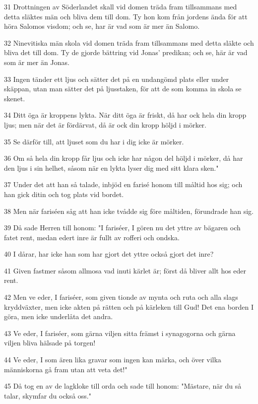 \par 31 Drottningen av Söderlandet skall vid domen träda fram tillsammans med detta släktes män och bliva dem till dom. Ty hon kom från jordens ända för att höra Salomos visdom; och se, har är vad som är mer än Salomo.
\par 32 Ninevitiska män skola vid domen träda fram tillsammans med detta släkte och bliva det till dom. Ty de gjorde bättring vid Jonas' predikan; och se, här är vad som är mer än Jonas.
\par 33 Ingen tänder ett ljus och sätter det på en undangömd plats eller under skäppan, utan man sätter det på ljusstaken, för att de som komma in skola se skenet.
\par 34 Ditt öga är kroppens lykta. När ditt öga är friskt, då har ock hela din kropp ljus; men när det är fördärvat, då är ock din kropp höljd i mörker.
\par 35 Se därför till, att ljuset som du har i dig icke är mörker.
\par 36 Om så hela din kropp får ljus och icke har någon del höljd i mörker, då har den ljus i sin helhet, såsom när en lykta lyser dig med sitt klara sken."
\par 37 Under det att han så talade, inbjöd en farisé honom till måltid hos sig; och han gick ditin och tog plats vid bordet.
\par 38 Men när fariséen såg att han icke tvådde sig före måltiden, förundrade han sig.
\par 39 Då sade Herren till honom: "I fariséer, I gören nu det yttre av bägaren och fatet rent, medan edert inre är fullt av rofferi och ondska.
\par 40 I dårar, har icke han som har gjort det yttre också gjort det inre?
\par 41 Given fastmer såsom allmosa vad inuti kärlet är; först då bliver allt hos eder rent.
\par 42 Men ve eder, I fariséer, som given tionde av mynta och ruta och alla slags kryddväxter, men icke akten på rätten och på kärleken till Gud! Det ena borden I göra, men icke underlåta det andra.
\par 43 Ve eder, I fariséer, som gärna viljen sitta främst i synagogorna och gärna viljen bliva hälsade på torgen!
\par 44 Ve eder, I som ären lika gravar som ingen kan märka, och över vilka människorna gå fram utan att veta det!"
\par 45 Då tog en av de lagkloke till orda och sade till honom: "Mästare, när du så talar, skymfar du också oss."
